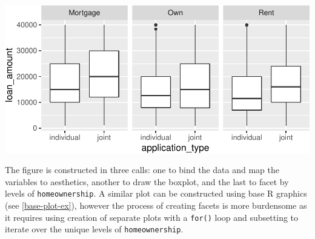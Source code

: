 \documentclass[12pt]{article}
\newenvironment{Shaded}{\begin{snugshade}}{\end{snugshade}}
\newcommand{\AttributeTok}[1]{\textcolor[rgb]{0.77,0.63,0.00}{#1}}
\newcommand{\ControlFlowTok}[1]{\textcolor[rgb]{0.13,0.29,0.53}{\textbf{#1}}}
\newcommand{\DecValTok}[1]{\textcolor[rgb]{0.00,0.00,0.81}{#1}}
\newcommand{\FunctionTok}[1]{\textcolor[rgb]{0.00,0.00,0.00}{#1}}
\newcommand{\NormalTok}[1]{#1}
\newcommand{\OtherTok}[1]{\textcolor[rgb]{0.56,0.35,0.01}{#1}}
\newcommand{\SpecialCharTok}[1]{\textcolor[rgb]{0.00,0.00,0.00}{#1}}
\begin{document}
\begin{center}\includegraphics[width=0.8\linewidth]{educators-perspective-tidyverse_files/figure-latex/ggplot_ex-1} \end{center}

\label{ggplot-exref} \linespread{2}
\vspace{3mm}\setlength{\parindent}{15pt}

The figure is constructed in three calls: one to bind the data and map
the variables to aesthetics, another to draw the boxplot, and the last
to facet by levels of \texttt{homeownership}. A similar plot can be
constructed using base R graphics (see \ref{base-plot-ex}), however the
process of creating facets is more burdensome as it requires using
creation of separate plots with a \texttt{for()} loop and subsetting to
iterate over the unique levels of \texttt{homeownership}.

\linespread{1}

\begin{Shaded}
\end{Shaded}
\end{document}
